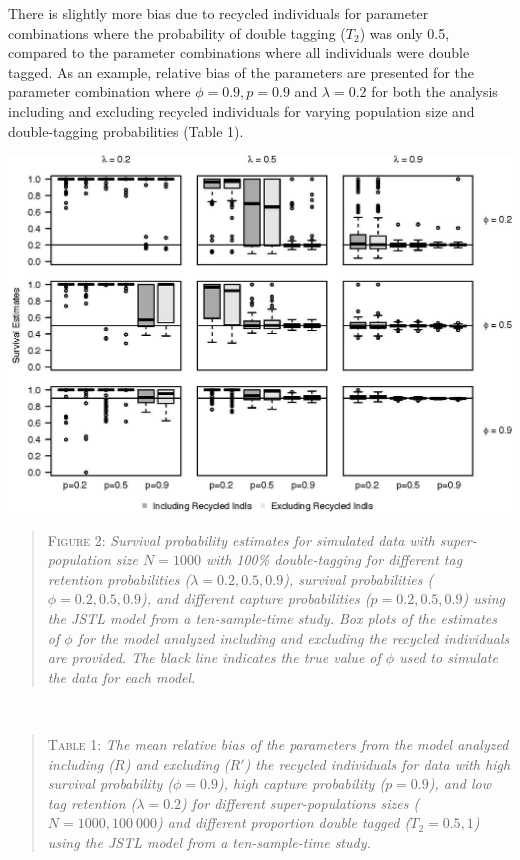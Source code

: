 \documentclass[12pt]{article}
\begin{document}
There is slightly more bias due to recycled individuals for parameter combinations 
where the probability of double tagging (\(T_2\)) was only 0.5, compared to the parameter combinations where all individuals were double tagged. As an example, relative bias of
the parameters are presented for the parameter combination where
\(\phi=0.9, p=0.9\) and \(\lambda=0.2\) for both the analysis including and
excluding recycled individuals for varying population size and
double-tagging probabilities (Table 1).

\includegraphics{RecycledPaper_files/figure-latex/Figure2_survival_GJSTL1-1.jpg}

\begin{quote}
\textsc{Figure 2:}
\textsl{Survival probability estimates for simulated data with super-population size $N=1000$ with 100\% double-tagging for different tag retention probabilities ($\lambda=0.2,0.5,0.9$), survival probabilities ($\phi=0.2,0.5,0.9$), and different capture probabilities ($p=0.2,0.5,0.9$) using the JSTL model from a ten-sample-time study. Box plots of the estimates of $\phi$ for the model analyzed including and excluding the recycled individuals are provided. The black line indicates the true value of $\phi$ used to simulate the data for each model.}
\end{quote}

~ ~

\begin{quote}
\textsc{Table 1:}
\textsl{The mean relative bias of the parameters from the model analyzed including ($R$) and excluding ($R'$) the recycled individuals for data with high survival probability ($\phi=0.9$), high capture probability ($p=0.9$), and low tag retention ($\lambda=0.2$)  for different super-populations sizes ($N=1000,100\ 000$) and different proportion double tagged ($T_2=0.5,1$) using the JSTL model from a ten-sample-time study. }
\end{quote}
\end{document}
